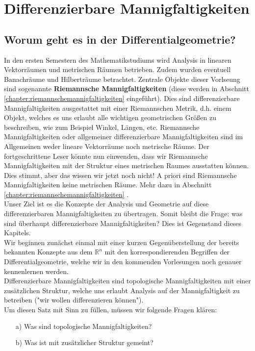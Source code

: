 \chapter{Differenzierbare Mannigfaltigkeiten}
\section*{Worum geht es in der Differentialgeometrie?}
In den ersten Semestern des Mathematikstudiums wird Analysis in linearen Vektorräumen und  metrischen Räumen betrieben. 
Zudem wurden eventuell Banachräume und Hilberträume betrachtet.
Zentrale Objekte dieser Vorlseung sind sogenannte \textbf{Riemannsche Mannigfaltigkeiten} (diese werden in Abschnitt \ref{chapter:riemannschemannigfaltigkeiten}  eingeführt).
Dies sind differenzierbare Mannigfaltigkeiten ausgestattet mit einer Riemannschen Metrik, d.h. einem Objekt, 
welches es uns erlaubt alle wichtigen geometrischen Größen zu beschreiben, wie zum Beispiel Winkel, Längen, etc.
Riemannsche Mannigfaltigkeiten oder allgemeiner differenzierbare Mannigfaltigkeiten sind im Allgemeinen weder lineare Vektorräume noch metrische Räume.
Der fortgeschrittene Leser könnte nun einwenden, dass wir Riemannsche Mannigfaltigkeiten mit der Struktur eines metrischen Raumes ausstatten können. 
Dies stimmt, aber das wissen wir jetzt noch nicht! 
A priori sind Riemannsche Mannigfaltigkeiten keine metrischen Räume. 
Mehr dazu in Abschnitt \ref{chapter:riemannschemannigfaltigkeiten}
. \\
Unser Ziel ist es die Konzepte der Analysis und Geometrie auf diese differenzierbaren Mannigfaltigkeiten zu übertragen.
Somit bleibt die Frage: was sind überhaupt differenzierbare Mannigfaltigkeiten?
Dies ist Gegenstand dieses Kapitels.\\
Wir beginnen zunächst einmal mit einer kurzen Gegenüberstellung der bereits bekannten Konzepte aus dem $\mathbb{R}^n$ mit den korrespondierenden Begriffen der Differentialgeometrie, welche wir in den kommenden Vorlesungen noch genauer kennenlernen werden. \\
Differenzierbare Mannigfaltigkeiten sind topologische Mannigfaltigkeiten mit einer zusätzlichen Struktur, welche uns erlaubt Analysis auf der Mannigfaltigkeit zu betreiben ("wir wollen differenzieren können").\\
Um diesen Satz mit Sinn zu füllen, müssen wir folgende Fragen klären:
\begin{itemize}
\label{item:frage1}
\item[a)]  Was sind topologische Mannigfaltigkeiten?
\label{item:frage2}
\item[b)]  Was ist mit zusätzlicher Struktur gemeint?
\end{itemize}

